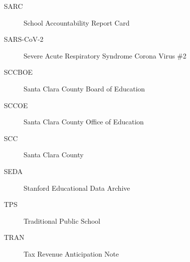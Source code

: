 \begin{description}
  \item[SARC] School Accountability Report Card
  \item[SARS-CoV-2] Severe Acute Respiratory Syndrome Corona Virus \#2
  \item[SCCBOE] Santa Clara County Board of Education
  \item[SCCOE] Santa Clara County Office of Education
  \item[SCC] Santa Clara County
  \item[SEDA] Stanford Educational Data Archive
  \item[TPS] Traditional Public School
  \item[TRAN] Tax Revenue Anticipation Note
\end{description}

